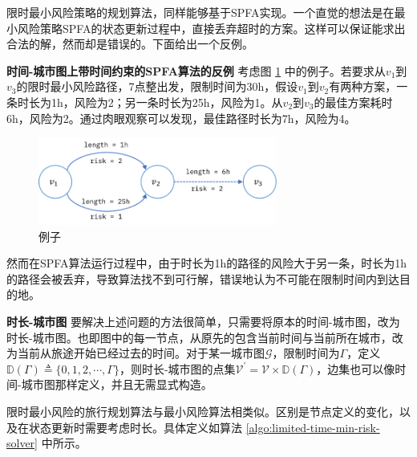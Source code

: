 限时最小风险策略的规划算法，同样能够基于SPFA实现。一个直觉的想法是在最小风险策略SPFA的状态更新过程中，直接丢弃超时的方案。这样可以保证能求出合法的解，然而却是错误的。下面给出一个反例。

\textbf{时间-城市图上带时间约束的SPFA算法的反例} \quad 考虑图 \ref{fig:bad-graph-example} 中的例子。若要求从$v_1$到$v_3$的限时最小风险路径，7点整出发，限制时间为30h，假设$v_1$到$v_2$有两种方案，一条时长为1h，风险为2；另一条时长为25h，风险为1。从$v_2$到$v_3$的最佳方案耗时6h，风险为2。通过肉眼观察可以发现，最佳路径时长为7h，风险为4。
\begin{figure}[t]
\centering
\includegraphics[width=0.7\textwidth]{figures/bad_graph_example}
\caption{例子}
\label{fig:bad-graph-example}
\end{figure}
然而在SPFA算法运行过程中，由于时长为1h的路径的风险大于另一条，时长为1h的路径会被丢弃，导致算法找不到可行解，错误地认为不可能在限制时间内到达目的地。

\textbf{时长-城市图} \quad 要解决上述问题的方法很简单，只需要将原本的时间-城市图，改为时长-城市图。也即图中的每一节点，从原先的包含当前时间与当前所在城市，改为当前从旅途开始已经过去的时间。对于某一城市图$\mathcal G$，限制时间为$\Gamma$，定义$\mathds D(\Gamma) \triangleq \{ 0, 1, 2, \cdots, \Gamma \}$，则时长-城市图的点集$\mathcal V^\prime = \mathcal V \times \mathds D(\Gamma)$，边集也可以像时间-城市图那样定义，并且无需显式构造。

限时最小风险的旅行规划算法与最小风险算法相类似。区别是节点定义的变化，以及在状态更新时需要考虑时长。具体定义如算法 \ref{algo:limited-time-min-risk-solver} 中所示。

